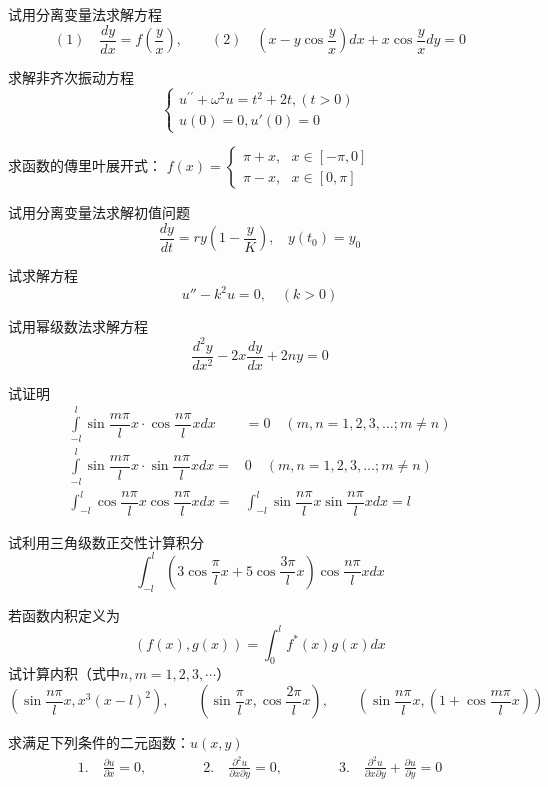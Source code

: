 \begin{Exercises}
	\item 
		试用分离变量法求解方程
		\begin{equation*}
		(1) \quad \frac{d y}{d x}=f\left(\frac{y}{x}\right), \qquad (2)\quad\left(x-y \cos \frac{y}{x}\right) d x+x \cos \frac{y}{x} d y=0
		\end{equation*}
	\item  
		求解非齐次振动方程 
		$$\begin{cases}
			u^{\prime \prime} +\omega ^2 u =t^2+2t, (t>0)\\
			u(0)=0, u'(0)=0
		\end{cases}$$
	\item 求函数的傳里叶展开式：
	 $\displaystyle f(x)=\begin{cases}
			\pi +x , ~~~ x \in [-\pi, 0] \\
			\pi -x ,~~~ x \in   [0, \pi] 
		\end{cases}$
	\item 试用分离变量法求解初值问题
	\begin{equation*}
			\frac{dy}{dt}	=  r y (1-\frac{y}{K}), ~~~~ y(t_0) = y_0
		\end{equation*}
	\item 试求解方程
		$$ u'' - k ^2 u =0, \quad (k > 0) $$
	\item 试用幂级数法求解方程
	\begin{equation*}
			\frac{d^2 y}{d x^2} -2x \frac{d y}{d x} +2n y =0 
		\end{equation*}
	\item 试证明	
	$$\begin{aligned}
	\int\limits_{-l}^l \sin \dfrac{m\pi}{l}  x \cdot \cos \dfrac{n\pi}{l} x d x &=0 \quad(m, n=1,2,3, \ldots ; m \neq n) \\
	\int\limits_{-l}^l \sin \dfrac{m\pi}{l} x \cdot \sin \dfrac{n\pi}{l} x d x= &0  \quad(m, n=1,2,3, \ldots ; m \neq n) \\
	\int_{-l}^l \cos \dfrac{n\pi}{l} x \cos \dfrac{n\pi}{l} x dx = &\int_{-l}^l \sin \dfrac{n\pi}{l} x \sin \dfrac{n\pi}{l} x dx =  l
	\end{aligned} $$
	\item 试利用三角级数正交性计算积分  
	$$ \int_{-l}^l (3\cos \dfrac{\pi}{l} x+ 5\cos \dfrac{3\pi}{l}x )\cos \dfrac{n\pi}{l} x dx  $$
	\item 若函数内积定义为
			$$\left( f(x), g(x) \right) = \int_{0}^{l} f^*(x)g(x) dx$$
			试计算内积（式中$n,m =1,2,3,\cdots$）
			$$\left(\sin \frac{n\pi}{l} x , x^3(x-l)^2 \right),  \qquad \left(\sin \frac{\pi}{l}x , \cos\frac{2\pi}{l}x \right), \qquad \left(\sin \frac{n\pi}{l} x , (1+\cos\frac{m\pi}{l}x) \right) $$
	\item 求满足下列条件的二元函数：$u(x, y)$
	      $$ \begin{aligned}
			1. \quad  \frac{\partial u}{\partial x}=0, \qquad \qquad 
			2. \quad \frac{\partial^2 u}{\partial x \partial y}=0 , \qquad \qquad 
            3. \quad \frac{\partial^2 u}{\partial x \partial y}+\frac{\partial u}{\partial y} =0
		  \end{aligned} $$
  \end{Exercises}